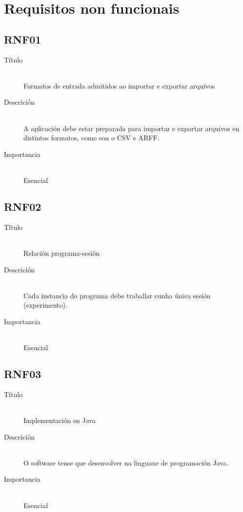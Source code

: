 \section{Requisitos non funcionais}

\subsection*{RNF01}
\begin{description}
\item[Título] \hfill \\
Formatos de entrada admitidos ao importar e exportar arquivos
\item[Descrición] \hfill \\
A aplicación debe estar preparada para importar e exportar arquivos en distintos formatos, como son o CSV e ARFF.
\item[Importancia] \hfill \\
Esencial
\end{description}

\subsection*{RNF02}
\begin{description}
\item[Título] \hfill \\
Relación programa-sesión
\item[Descrición] \hfill \\
Cada instancia do programa debe traballar cunha única sesión (experimento).
\item[Importancia] \hfill \\
Esencial
\end{description}

\subsection*{RNF03}
\begin{description}
\item[Título] \hfill \\
Implementación en Java
\item[Descrición] \hfill \\
O software tense que desenvolver na linguaxe de programación Java.
\item[Importancia] \hfill \\
Esencial
\end{description}

